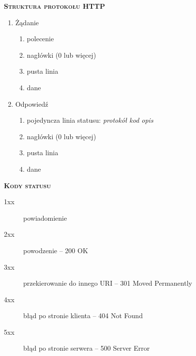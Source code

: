 \textsc{\textbf{Struktura protokołu HTTP}}

\begin{enumerate}
\item Żądanie
	\begin{enumerate}
	\item{polecenie}
	\item{nagłówki (0 lub więcej)}
	\item pusta linia
	\item dane
	\end{enumerate}
\item Odpowiedź
	\begin{enumerate}
		\item pojedyncza linia statusu: \textit{protokół kod opis}
		\item{nagłówki (0 lub więcej)}
		\item pusta linia
		\item dane
	\end{enumerate}
\end{enumerate}


\textsc{\textbf{Kody statusu}}

\begin{description}
\item[1xx] powiadomienie
\item[2xx] powodzenie – 200 OK
\item[3xx] przekierowanie do innego URI – 301 Moved Permanently
\item[4xx] błąd po stronie klienta – 404 Not Found
\item[5xx] błąd po stronie serwera – 500 Server Error
\end{description}

